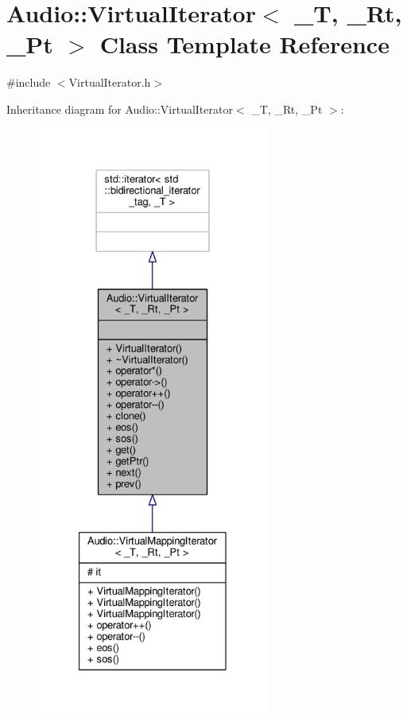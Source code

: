 \hypertarget{classAudio_1_1VirtualIterator}{}\section{Audio\+:\+:Virtual\+Iterator$<$ \+\_\+T, \+\_\+\+Rt, \+\_\+\+Pt $>$ Class Template Reference}
\label{classAudio_1_1VirtualIterator}


{\ttfamily \#include $<$Virtual\+Iterator.\+h$>$}



Inheritance diagram for Audio\+:\+:Virtual\+Iterator$<$ \+\_\+T, \+\_\+\+Rt, \+\_\+\+Pt $>$\+:
\nopagebreak
\begin{figure}[H]
\begin{center}
\leavevmode
\includegraphics[height=550pt]{d9/d3c/classAudio_1_1VirtualIterator__inherit__graph}
\end{center}
\end{figure}


